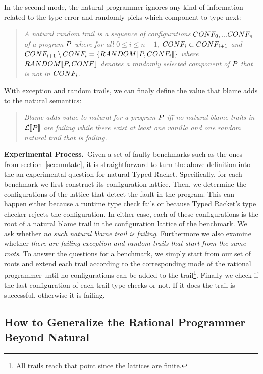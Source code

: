 In the second mode, the natural programmer
ignores any kind of information related to the type error and randomly
picks which component to type next:
\begin{quote}
\it 
A natural random trail
is a sequence of configurations $CONF_0,...CONF_n$ of a program
$P$ where for all $0 \leq i \leq n - 1$, $CONF_i \subset CONF_{i+1}$ and
$CONF_{i+1} \setminus CONF_i = \{RANDOM\llbracket P, CONF_i\rrbracket\}$
where $RANDOM\llbracket P, CONF\rrbracket$ denotes a randomly selected component of $P$
that is not in $CONF_i$.
\end{quote}
\noindent

With exception and random trails, we can finaly define the value that blame
adds to the natural semantics: 
\begin{quote}
\it
  Blame adds value to natural for a program $P$ iff 
  no natural blame trails in  $\mathcal{L}\llbracket P\rrbracket$ are failing while 
 there exist at least one vanilla and one random natural trail that is
  failing.
\end{quote}

 

\noindent
{\bf Experimental Process.}~Given a set of faulty benchmarks such as the
ones from section~\ref{sec:mutate}, it is straightforward to turn the
above definition into the an experimental question for natural Typed Racket. 
Specifically, for
each benchmark we first construct its configuration lattice. Then, we
determine the configurations of the lattice that detect the fault in the
program. This can happen either because a runtime type check fails or
because Typed Racket's type checker rejects the configuration. In either
case,  each of these configurations is the root of a natural blame trail
in the configuration lattice of the benchmark. We ask whether
\emph{no such natural blame trail is failing}.  Furthermore  we also
examine whether \emph{there are failing exception and random trails that start
from the same roots}.  To answer the questions for a
benchmark, we simply start from our set of roots and extend each
trail according to the corresponding mode of the rational programmer
until no configurations can be added to the trail\footnote{All trails
reach that point since the lattices are finite.}. Finally we check if the
last configuration of each trail type checks or not. If it does the trail
is successful, otherwise it is failing. 

\subsection{How to Generalize the Rational Programmer Beyond Natural} 

